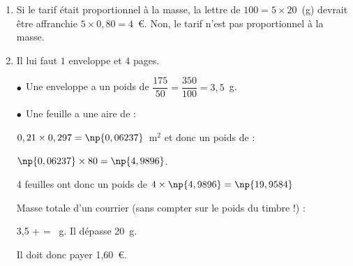 
\medskip

\begin{enumerate}
\item Si le tarif était proportionnel à la masse, la lettre de $100 = 5 \times 20$~(g) devrait être affranchie $5 \times 0,80 = 4$~\euro. Non, le tarif n'est pas proportionnel à la masse.
\item Il lui faut $1$ enveloppe et $4$ pages.

$\bullet~~$Une enveloppe a un poids de $\dfrac{175}{50} = \dfrac{350}{100} = 3,5$~g.

$\bullet~~$Une feuille a une aire de :

$0,21 \times 0,297 = \np{0,06237}$~m$^2$ et donc un poids de :

$\np{0,06237} \times 80 = \np{4,9896}$.

4 feuilles ont donc un poids de $4 \times \np{4,9896}  = \np{19,9584}$

Masse totale d'un courrier (sans compter sur le poids du timbre !) : 

3,5 +  = ~g. Il dépasse 20~g.

Il doit donc payer 1,60~\euro.
\end{enumerate}
